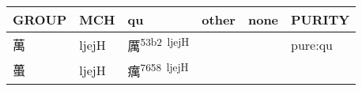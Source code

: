 \documentclass[14pt,a4paper]{scrartcl}
\begin{document}
\begin{longtable}[c]{@{}llllll@{}}
\toprule
\begin{minipage}[b]{0.14\columnwidth}\raggedright\strut
GROUP
\strut\end{minipage} &
\begin{minipage}[b]{0.14\columnwidth}\raggedright\strut
MCH
\strut\end{minipage} &
\begin{minipage}[b]{0.14\columnwidth}\raggedright\strut
qu
\strut\end{minipage} &
\begin{minipage}[b]{0.14\columnwidth}\raggedright\strut
other
\strut\end{minipage} &
\begin{minipage}[b]{0.14\columnwidth}\raggedright\strut
none
\strut\end{minipage} &
\begin{minipage}[b]{0.14\columnwidth}\raggedright\strut
PURITY
\strut\end{minipage}\tabularnewline
\midrule
\endhead
\begin{minipage}[t]{0.14\columnwidth}\raggedright\strut
萬
\strut\end{minipage} &
\begin{minipage}[t]{0.14\columnwidth}\raggedright\strut
ljejH
\strut\end{minipage} &
\begin{minipage}[t]{0.14\columnwidth}\raggedright\strut
厲\textsuperscript{53b2~ljejH}
\strut\end{minipage} &
\begin{minipage}[t]{0.14\columnwidth}\raggedright\strut
\strut\end{minipage} &
\begin{minipage}[t]{0.14\columnwidth}\raggedright\strut
\strut\end{minipage} &
\begin{minipage}[t]{0.14\columnwidth}\raggedright\strut
pure:qu
\strut\end{minipage}\tabularnewline
\begin{minipage}[t]{0.14\columnwidth}\raggedright\strut
蠆
\strut\end{minipage} &
\begin{minipage}[t]{0.14\columnwidth}\raggedright\strut
ljejH
\strut\end{minipage} &
\begin{minipage}[t]{0.14\columnwidth}\raggedright\strut
癘\textsuperscript{7658~ljejH}
\strut\end{minipage} &

\end{longtable}
\end{document}
